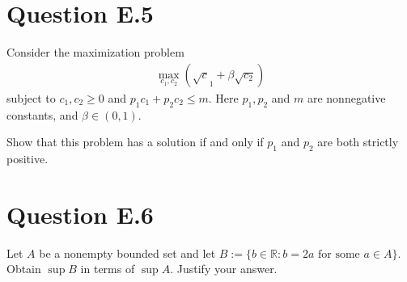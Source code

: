 \documentclass[letterpaper,10pt,english]{jupyterBook}
\begin{document}
\section{Question E.5}
\label{\detokenize{06.exercises.E:question-e-5}}
\sphinxAtStartPar
Consider the maximization problem
\begin{equation*}
\begin{split}
%
\max_{c_1, c_2} ( \sqrt c_1 + \beta \sqrt{c_2})
%
\end{split}
\end{equation*}
\sphinxAtStartPar
subject to \(c_1, c_2 \geq 0\) and \(p_1 c_1 + p_2 c_2 \leq m\).
Here \(p_1, p_2\) and \(m\) are nonnegative constants, and \(\beta \in (0, 1)\).

\sphinxAtStartPar
Show that this problem has a solution if and only if \(p_1\) and \(p_2\) are both
strictly positive.


\section{Question E.6}
\label{\detokenize{06.exercises.E:question-e-6}}
\sphinxAtStartPar
Let \(A\) be a nonempty bounded set and let \(B := \{ b \in \mathbb{R} \colon b = 2a \text{ for some } a \in A\}\).
Obtain \(\sup B\) in terms of \(\sup A\). Justify your answer.







\renewcommand{\indexname}{Index}
\printindex
\end{document}
